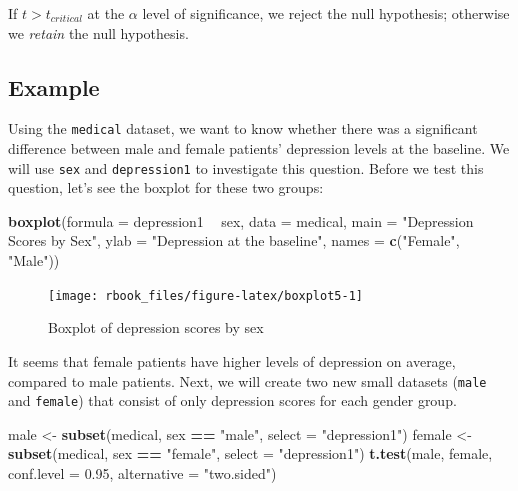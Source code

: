 \documentclass[]{book}
\newenvironment{Shaded}{\begin{snugshade}}{\end{snugshade}}
\newcommand{\DataTypeTok}[1]{\textcolor[rgb]{0.13,0.29,0.53}{#1}}
\newcommand{\FloatTok}[1]{\textcolor[rgb]{0.00,0.00,0.81}{#1}}
\newcommand{\KeywordTok}[1]{\textcolor[rgb]{0.13,0.29,0.53}{\textbf{#1}}}
\newcommand{\NormalTok}[1]{#1}
\newcommand{\OperatorTok}[1]{\textcolor[rgb]{0.81,0.36,0.00}{\textbf{#1}}}
\newcommand{\StringTok}[1]{\textcolor[rgb]{0.31,0.60,0.02}{#1}}
\begin{document}
If \(t > t_{critical}\) at the \(\alpha\) level of significance, we reject the null hypothesis; otherwise we \emph{retain} the null hypothesis.

\hypertarget{example-1}{%
\subsection{Example}\label{example-1}}

Using the \texttt{medical} dataset, we want to know whether there was a significant difference between male and female patients' depression levels at the baseline. We will use \texttt{sex} and \texttt{depression1} to investigate this question. Before we test this question, let's see the boxplot for these two groups:

\begin{Shaded}
\begin{Highlighting}[]
\KeywordTok{boxplot}\NormalTok{(}\DataTypeTok{formula =}\NormalTok{ depression1 }\OperatorTok{~}\StringTok{ }\NormalTok{sex,}
        \DataTypeTok{data =}\NormalTok{ medical,}
        \DataTypeTok{main =} \StringTok{"Depression Scores by Sex"}\NormalTok{,}
        \DataTypeTok{ylab =} \StringTok{"Depression at the baseline"}\NormalTok{,}
        \DataTypeTok{names =} \KeywordTok{c}\NormalTok{(}\StringTok{"Female"}\NormalTok{, }\StringTok{"Male"}\NormalTok{))}
\end{Highlighting}
\end{Shaded}

\begin{figure}

{\centering \texttt{[image: rbook\_files/figure-latex/boxplot5-1]} 

}

\caption{Boxplot of depression scores by sex}\label{fig:boxplot5}
\end{figure}

It seems that female patients have higher levels of depression on average, compared to male patients. Next, we will create two new small datasets (\texttt{male} and \texttt{female}) that consist of only depression scores for each gender group.

\begin{Shaded}
\begin{Highlighting}[]
\NormalTok{male <-}\StringTok{ }\KeywordTok{subset}\NormalTok{(medical, sex }\OperatorTok{==}\StringTok{ "male"}\NormalTok{, }\DataTypeTok{select =} \StringTok{"depression1"}\NormalTok{)}
\NormalTok{female <-}\StringTok{ }\KeywordTok{subset}\NormalTok{(medical, sex }\OperatorTok{==}\StringTok{ "female"}\NormalTok{, }\DataTypeTok{select =} \StringTok{"depression1"}\NormalTok{)}
\KeywordTok{t.test}\NormalTok{(male, female, }\DataTypeTok{conf.level =} \FloatTok{0.95}\NormalTok{, }\DataTypeTok{alternative =} \StringTok{"two.sided"}\NormalTok{)}
\end{Highlighting}
\end{Shaded}
\end{document}
